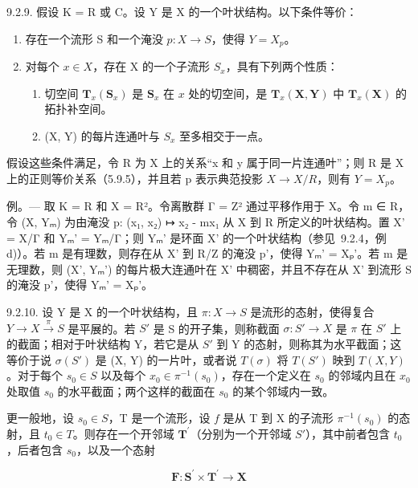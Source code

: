 9.2.9. 假设 K = R 或 C。设 Y 是 X 的一个叶状结构。以下条件等价：

\begin{enumerate}
\def\labelenumi{\alph{enumi})}
\item
  存在一个流形 S 和一个淹没 \(p: X \to S\)，使得 \(Y = X_p\)。
\item
  对每个 \(x \in X\)，存在 X 的一个子流形 \(S_{x}\)，具有下列两个性质：
\begin{enumerate}
\item[\(b_1)\)] 切空间 \(\mathbf{T}_{x}(\mathbf{S}_{x})\) 是 \(\mathbf{S}_{x}\) 在 \(x\) 处的切空间，是 \(\mathbf{T}_{x}(\mathbf{X},\mathbf{Y})\) 中 \(\mathbf{T}_{x}(\mathbf{X})\) 的拓扑补空间。
\item[\(b_2)\)] (X, Y) 的每片连通叶与 \(S_{x}\) 至多相交于一点。
\end{enumerate}
\end{enumerate}

假设这些条件满足，令 R 为 X 上的关系“x 和 y 属于同一片连通叶”；则 R 是 X 上的正则等价关系（5.9.5），并且若 p 表示典范投影 \(X \to X/R\)，则有 \(Y = X_p\)。

例。--- 取 K = R 和 X = R²。令离散群 Γ = Z² 通过平移作用于 X。令 m ∈ R，令 (X, Yₘ) 为由淹没 p: (x₁, x₂) ↦ x₂ - mx₁ 从 X 到 R 所定义的叶状结构。置 X' = X/Γ 和 Yₘ' = Yₘ/Γ；则 Yₘ' 是环面 X' 的一个叶状结构（参见~9.2.4，例 d)）。若 m 是有理数，则存在从 X' 到 R/Z 的淹没 p'，使得 Yₘ' = Xₚ'。若 m 是无理数，则 (X', Yₘ') 的每片极大连通叶在 X' 中稠密，并且不存在从 X' 到流形 S 的淹没 p'，使得 Yₘ' = Xₚ'。

9.2.10. 设 Y 是 X 的一个叶状结构，且 \(\pi: X \to S\) 是流形的态射，使得复合 \(Y \to X \xrightarrow{\pi} S\) 是平展的。若 \(S'\) 是 S 的开子集，则称截面 \(\sigma: S' \to X\) 是 \(\pi\) 在 \(S'\) 上的截面；相对于叶状结构 Y，若它是从 \(S'\) 到 Y 的态射，则称其为水平截面；这等价于说 \(\sigma(S')\) 是 (X, Y) 的一片叶，或者说 \(T(\sigma)\) 将 \(T(S')\) 映到 \(T(X, Y)\)。对于每个 \(s_0 \in S\) 以及每个 \(x_0 \in \pi^{-1}(s_0)\)，存在一个定义在 \(s_0\) 的邻域内且在 \(x_0\) 处取值 \(s_0\) 的水平截面；两个这样的截面在 \(s_0\) 的某个邻域内一致。

更一般地，设 \(s_{0}\in S\)，T 是一个流形，设 \(f\) 是从 T 到 X 的子流形 \(\pi^{-1}(s_{0})\) 的态射，且 \(t_{0}\in T\)。则存在一个开邻域 \(\mathbf{T}^{\prime}\)（分别为一个开邻域 \(S'\)），其中前者包含 \(t_{0}\)，后者包含 \(s_{0}\)，以及一个态射

\[
\mathbf {F}: \mathbf {S} ^ {\prime} \times \mathbf {T} ^ {\prime} \rightarrow \mathbf {X}
\]


